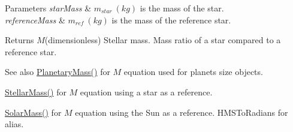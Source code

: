 \begin{DoxyParams}{Parameters}
{\em star\+Mass} & $m_{star}\ (kg)$ is the mass of the star. \\
\hline
{\em reference\+Mass} & $m_{ref}\ (kg)$ is the mass of the reference star. \\
\hline
\end{DoxyParams}
\begin{DoxyReturn}{Returns}
$M$(dimensionless) Stellar mass. Mass ratio of a star compared to a reference star. 
\end{DoxyReturn}
\begin{DoxySeeAlso}{See also}
\mbox{\hyperlink{group___e_g_x_phys-_planetary_mass_ga225bcf56fb37468f6d4d46493d403503}{Planetary\+Mass()}} for $M$ equation used for planets size objects. 

\mbox{\hyperlink{group___e_g_x_phys-_b_v_color_gabbd6081cd3bfb0153d7470d58f733a61}{Stellar\+Mass()}} for $M$ equation using a star as a reference. 

\mbox{\hyperlink{group___e_g_x_phys-_b_v_color_gac393d64d586be3dc76ac7a98ac336514}{Solar\+Mass()}} for $M$ equation using the Sun as a reference.  H\+M\+S\+To\+Radians for alias. 
\end{DoxySeeAlso}
